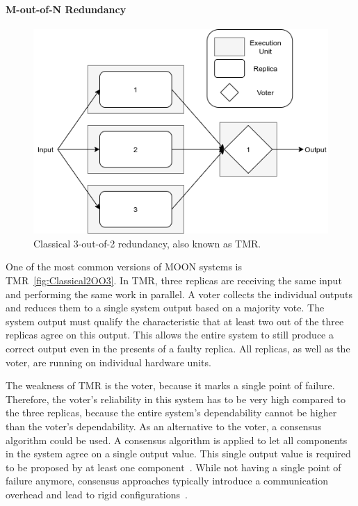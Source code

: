 \paragraph{M-out-of-N Redundancy}
\begin{figure}[!hb]
	\centering
	\includegraphics[width=0.75\linewidth]{images/Classical2OO3}
	\caption{Classical 3-out-of-2 redundancy, also known as \Gls*{TMR}.}
	\label{fig:Classical2OO3}
\end{figure}

One of the most common versions of \gls*{MOON} systems is \gls*{TMR}~\autoref{fig:Classical2OO3}.
In \gls*{TMR}, three replicas are receiving the same input and performing the same work in parallel.
A voter collects the individual outputs and reduces them to a single system output based on a majority vote.
The system output must qualify the characteristic that at least two out of the three replicas agree on this output.
This allows the entire system to still produce a correct output even in the presents of a faulty replica.
All replicas, as well as the voter, are running on individual hardware units.

The weakness of \gls*{TMR} is the voter, because it marks a single point of failure.
Therefore, the voter's reliability in this system has to be very high compared to the three replicas, because the entire system's dependability cannot be higher than the voter's dependability.
As an alternative to the voter, a consensus algorithm could be used.
A consensus algorithm is applied to let all components in the system agree on a single output value.
This single output value is required to be proposed by at least one component~\cite{lamport2001paxos}.
While not having a single point of failure anymore, consensus approaches typically introduce a communication overhead and lead to rigid configurations~\cite{GamerIncreasingMOON}.

